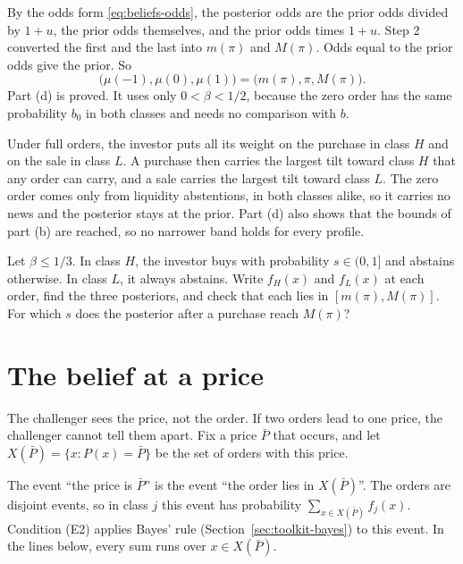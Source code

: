 By the odds form \eqref{eq:beliefs-odds}, the posterior odds are the prior odds divided by \(1+u\), the prior odds themselves, and the prior odds times \(1+u\). Step 2 converted the first and the last into \(m(\pi)\) and \(M(\pi)\). Odds equal to the prior odds give the prior. So
\[
\bigl(\mu(-1),\mu(0),\mu(1)\bigr)=\bigl(m(\pi),\pi,M(\pi)\bigr).
\]
Part (d) is proved. It uses only \(0<\beta<1/2\), because the zero order has the same probability \(b_0\) in both classes and needs no comparison with \(b\).

\begin{intuition}
Under full orders, the investor puts all its weight on the purchase in class \(H\) and on the sale in class \(L\). A purchase then carries the largest tilt toward class \(H\) that any order can carry, and a sale carries the largest tilt toward class \(L\). The zero order comes only from liquidity abstentions, in both classes alike, so it carries no news and the posterior stays at the prior. Part (d) also shows that the bounds of part (b) are reached, so no narrower band holds for every profile.
\end{intuition}

\begin{checkyourself}\label{q:beliefs-mixed}
Let \(\beta\le1/3\). In class \(H\), the investor buys with probability \(s\in(0,1]\) and abstains otherwise. In class \(L\), it always abstains. Write \(f_H(x)\) and \(f_L(x)\) at each order, find the three posteriors, and check that each lies in \([m(\pi),M(\pi)]\). For which \(s\) does the posterior after a purchase reach \(M(\pi)\)?
\end{checkyourself}


\section{The belief at a price}\label{sec:beliefs-price-belief}

The challenger sees the price, not the order. If two orders lead to one price, the challenger cannot tell them apart. Fix a price \(\bar P\) that occurs, and let \(X(\bar P)=\{x:P(x)=\bar P\}\) be the set of orders with this price.

The event ``the price is \(\bar P\)'' is the event ``the order lies in \(X(\bar P)\)''. The orders are disjoint events, so in class \(j\) this event has probability \(\sum_{x\in X(\bar P)}f_j(x)\). Condition (E2) applies Bayes' rule (Section~\ref{sec:toolkit-bayes}) to this event. In the lines below, every sum runs over \(x\in X(\bar P)\).

